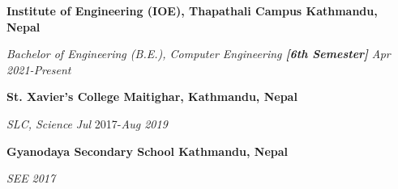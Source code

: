 \textbf{Institute of Engineering (IOE), Thapathali Campus \hfill Kathmandu, Nepal} \par
\textit{Bachelor of Engineering (B.E.), Computer Engineering \textbf{[6th Semester]}} \hfill \textit{Apr  2021-Present}\par

\textbf{St. Xavier's College \hfill Maitighar, Kathmandu, Nepal} \par
\textit{SLC, Science} \hfill \textit{Jul}  2017-\textit{Aug 2019}\par

\textbf{Gyanodaya Secondary School \hfill Kathmandu, Nepal} \par
\textit{SEE} \hfill \textit{2017}\par
